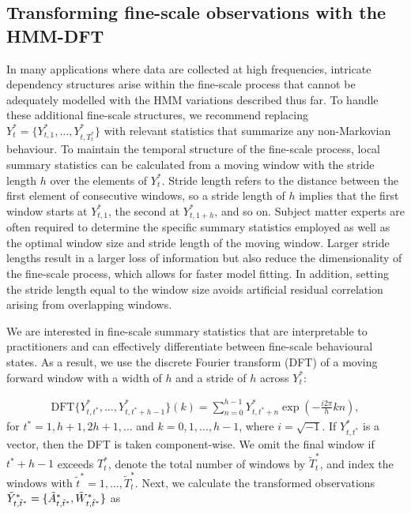 \subsection{Transforming fine-scale observations with the HMM-DFT}
\label{subsec:STFT}

In many applications where data are collected at high frequencies, intricate dependency structures arise within the fine-scale process that cannot be adequately modelled with the HMM variations described thus far. To handle these additional fine-scale structures, we recommend replacing $Y^*_t = \{Y^*_{t,1},\ldots,Y^*_{t,T^*_t}\}$ with relevant statistics that summarize any non-Markovian behaviour. To maintain the temporal structure of the fine-scale process, local summary statistics can be calculated from a moving window with the stride length $h$ over the elements of $Y^*_t$. Stride length refers to the distance between the first element of consecutive windows, so a stride length of $h$ implies that the first window starts at $Y^*_{t,1}$, the second at $Y^*_{t,1+h}$, and so on. Subject matter experts are often required to determine the specific summary statistics employed as well as the optimal window size and stride length of the moving window. Larger stride lengths result in a larger loss of information but also reduce the dimensionality of the fine-scale process, which allows for faster model fitting. In addition, setting the stride length equal to the window size avoids artificial residual correlation arising from overlapping windows. 

We are interested in fine-scale summary statistics that are interpretable to practitioners and can effectively differentiate between fine-scale behavioural states. As a result, we use the discrete Fourier transform (DFT) of a moving forward window with a width of $h$ and a stride of $h$ across $Y^*_t$:

\begin{align}
    \mathrm{DFT}\{Y^*_{t,t^*},\ldots, Y^*_{t,t^*+h-1}\}(k) = \sum_{n=0}^{h-1} Y^*_{t,t^*+n}\exp\left(-\frac{i 2\pi}{h} kn \right),
    \label{eq:DFTdef}
\end{align}
%
for $t^* = 1,h+1,2h+1,\ldots$ and $k = 0, 1, \ldots, h-1$, where $i = \sqrt{-1}$. If $Y^*_{t,t^*}$ is a vector, then the DFT is taken component-wise. We omit the final window if $t^*+h-1$ exceeds $T^*_t$, denote the total number of windows by $\tilde T^*_t$, and index the windows with $\tilde{t}^* = 1,\ldots,\tilde T^*_t$. Next, we calculate the transformed observations $\tilde{Y}^*_{t,\tilde{t}^*} = \{\tilde{A}^*_{t,\tilde{t}^*},\tilde{W}^*_{t,\tilde{t}^*}\}$ as

